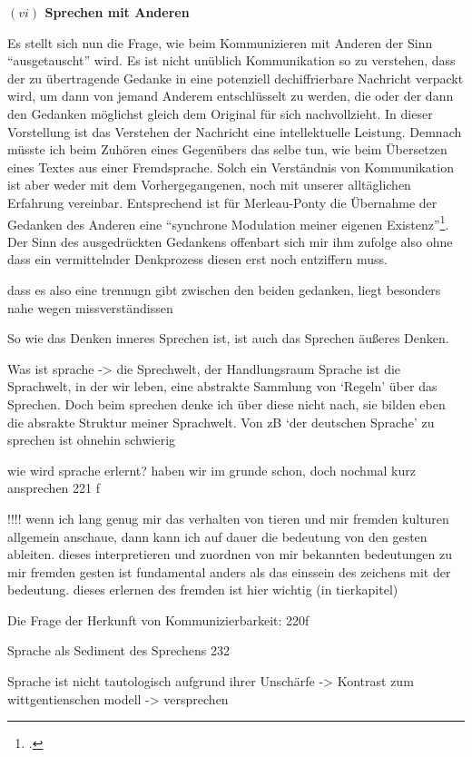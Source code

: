 \documentclass[a4paper, 12pt]{article}
\begin{document}
\begin{onehalfspace}
\noindent\textbf{$(vi)$ Sprechen mit Anderen}

\noindent Es stellt sich nun die Frage, wie beim Kommunizieren mit Anderen der Sinn "`ausgetauscht"' wird. Es ist nicht unüblich Kommunikation so zu verstehen, dass der zu übertragende Gedanke in eine potenziell dechiffrierbare Nachricht verpackt wird, um dann von jemand Anderem entschlüsselt zu werden, die oder der dann den Gedanken möglichst gleich dem Original für sich nachvollzieht. In dieser Vorstellung ist das Verstehen der Nachricht eine intellektuelle Leistung. Demnach müsste ich beim Zuhören eines Gegenübers das selbe tun, wie beim Übersetzen eines Textes aus einer Fremdsprache. Solch ein Verständnis von Kommunikation ist aber weder mit dem Vorhergegangenen, noch mit unserer alltäglichen Erfahrung vereinbar. Entsprechend ist für Merleau-Ponty die Übernahme der Gedanken des Anderen eine "`synchrone Modulation meiner eigenen Existenz"'\footnote{\Cite[Siehe][S. 218]{merleau1966phanomenologie}.}. Der Sinn des ausgedrückten Gedankens offenbart sich mir ihm zufolge also ohne dass ein vermittelnder Denkprozess diesen erst noch entziffern muss.

dass es also eine trennugn gibt zwischen den beiden gedanken, liegt besonders nahe wegen missverständissen

So wie das Denken inneres Sprechen ist, ist auch das Sprechen äußeres Denken. 



Was ist sprache -> die Sprechwelt, der Handlungsraum
Sprache ist die Sprachwelt, in der wir leben, eine abstrakte Sammlung von ‘Regeln’ über das Sprechen. Doch beim sprechen denke ich über diese nicht nach, sie bilden eben die absrakte Struktur meiner Sprachwelt. Von zB ‘der deutschen Sprache’ zu sprechen ist ohnehin schwierig

wie wird sprache erlernt? haben wir im grunde schon, doch nochmal kurz ansprechen 221 f

!!!! wenn ich lang genug mir das verhalten von tieren und mir fremden kulturen allgemein anschaue, dann kann ich auf dauer die bedeutung von den gesten ableiten. dieses interpretieren und zuordnen von mir bekannten bedeutungen zu mir fremden gesten ist fundamental anders als das einssein des zeichens mit der bedeutung. dieses erlernen des fremden ist hier wichtig (in tierkapitel)
	

Die Frage der Herkunft von Kommunizierbarkeit: 220f

Sprache als Sediment des Sprechens 232

Sprache ist nicht tautologisch aufgrund ihrer Unschärfe
-> Kontrast zum wittgentienschen modell
-> versprechen


\end{onehalfspace}
\end{document}
